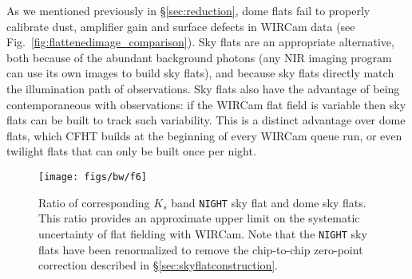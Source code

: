 \documentclass[iop,tighten]{emulateapj}
\newcommand{\Fig}[1]{Fig.~\ref{fig:#1}}  %
\newcommand{\Sec}[1]{\S\ref{sec:#1}}  %
\begin{document}
As we mentioned previously in \Sec{reduction}, dome flats fail to properly calibrate dust, amplifier gain and surface defects in WIRCam data (see \Fig{flattenedimage_comparison}).
Sky flats are an appropriate alternative, both because of the abundant background photons (any NIR imaging program can use its own images to build sky flats), and because sky flats directly match the illumination path of observations.
Sky flats also have the advantage of being contemporaneous with observations: if the WIRCam flat field is variable then sky flats can be built to track such variability.
This is a distinct advantage over dome flats, which CFHT builds at the beginning of every WIRCam queue run, or even twilight flats that can only be built once per night.

\begin{figure}[t]
\centering
\texttt{[image: figs/bw/f6]}
\caption{Ratio of corresponding $K_s$ band \texttt{NIGHT} sky flat and dome sky flats.
This ratio provides an approximate upper limit on the systematic uncertainty of flat fielding with WIRCam.
Note that the \texttt{NIGHT} sky flats have been renormalized to remove the chip-to-chip zero-point correction described in \Sec{skyflatconstruction}.}
\label{fig:flatratio}
\end{figure}
\end{document}
